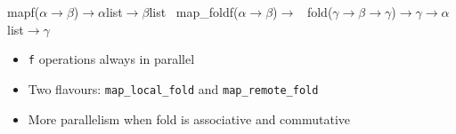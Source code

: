 \documentclass[xcolor=dvipsnames]{beamer}
\begin{document}
\begin{frame}
{{\begin{minipage}{\textwidth}
\noindent{}\hspace*{1.22ex}map\hspace*{1.22ex}f(\ensuremath{\alpha}\hspace*{1.22ex}\ensuremath{\rightarrow}\hspace*{1.22ex}\ensuremath{\beta})\hspace*{1.22ex}\ensuremath{\rightarrow}\hspace*{1.22ex}\ensuremath{\alpha}\hspace*{1.22ex}list\hspace*{1.22ex}\ensuremath{\rightarrow}\hspace*{1.22ex}\ensuremath{\beta}\hspace*{1.22ex}list~\linebreak
\noindent{}\hspace*{1.22ex}map\_{}fold\hspace*{1.22ex}f(\ensuremath{\alpha}\hspace*{1.22ex}\ensuremath{\rightarrow}\hspace*{1.22ex}\ensuremath{\beta})\hspace*{1.22ex}\ensuremath{\rightarrow}\hspace*{1.22ex}~\linebreak
\noindent\hspace*{7.00em}fold(\ensuremath{\gamma}\hspace*{1.22ex}\ensuremath{\rightarrow}\hspace*{1.22ex}\ensuremath{\beta}\hspace*{1.22ex}\ensuremath{\rightarrow}\hspace*{1.22ex}\ensuremath{\gamma})\hspace*{1.22ex}\ensuremath{\rightarrow}\hspace*{1.22ex}\ensuremath{\gamma}\hspace*{1.22ex}\ensuremath{\rightarrow}\hspace*{1.22ex}\ensuremath{\alpha}\hspace*{1.22ex}list\hspace*{1.22ex}\ensuremath{\rightarrow}\hspace*{1.22ex}\ensuremath{\gamma}
\end{minipage}}}


\medskip\noindent
  \begin{itemize}
  \item \texttt{f} operations always in parallel
  \item Two flavours: \texttt{map\_local\_fold} and
    \texttt{map\_remote\_fold}
  \item More parallelism when fold is associative and commutative
  \end{itemize}
  


\end{frame}
\end{document}
